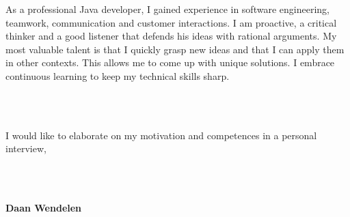 \documentclass[11pt,a4paper,arial]{moderncv}        %
\begin{document}

As a professional Java developer, I gained experience in software engineering, teamwork, communication and customer interactions.
I am proactive, a critical thinker and a good listener that defends his ideas with rational arguments.
My most valuable talent is that I quickly grasp new ideas and that I can apply them in other contexts. This allows me to come up with unique solutions.
I embrace continuous learning to keep my technical skills sharp.


~\\
~

I would like to elaborate on my motivation and competences in a personal interview,

~\\
~

\textbf {Daan Wendelen}

\makeletterclosing
\end{document}
